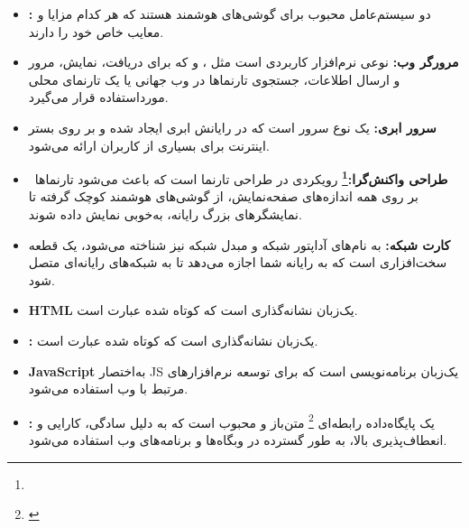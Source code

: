 \documentclass[12pt,a4paper,oneside]{article}
\begin{document}
\begin{itemize}
					    \item 
					  \textbf{: \label{ref:androidios}}
					  دو سیستم‌عامل محبوب برای گوشی‌های هوشمند هستند که هر کدام مزایا و معایب خاص خود را دارند.

					  \item 
					  \textbf{مرورگر وب:\label{ref:browser}}
					   نوعی نرم‌افزار کاربردی است مثل 
					    ، و 
						که برای دریافت، نمایش، مرور و ارسال اطلاعات، جستجوی تارنماها در وب جهانی یا یک تارنمای محلی مورداستفاده قرار می‌گیرد.
						
						\item 
					  \textbf{سرور ابری:\label{ref:cloudserver}}
					   یک نوع سرور است که در رایانش ابری ایجاد شده و بر روی بستر اینترنت برای بسیاری از کاربران ارائه می‌شود. 
					   
					   \item 
					    \textbf{طراحی واکنش‌گرا:\footnote{}\label{ref:responsivedesign}} رویکردی در طراحی تارنما است که باعث می‌شود تارنماها بر روی همه اندازه‌های صفحه‌نمایش، از گوشی‌های هوشمند کوچک گرفته تا نمایشگرهای بزرگ رایانه، به‌خوبی نمایش داده شوند.

						\item
					  \textbf{ کارت شبکه:\label{ref:networkcard}}
						به نام‌های آداپتور شبکه و مبدل شبکه نیز شناخته می‌شود، یک قطعه سخت‌افزاری است که به رایانه شما اجازه می‌دهد تا به شبکه‌های رایانه‌ای متصل شود.

						\item
					   \textbf{HTML\rl{:}\label{ref:html}}
					   یک‌زبان نشانه‌گذاری است که کوتاه شده عبارت
					     است.
					     
					   \item
					   \textbf{:\label{ref:css}}
					    یک‌زبان نشانه‌گذاری است که کوتاه شده عبارت
					      است.
					      
					   \item
					   \textbf{JavaScript\rl{:}\label{ref:js}}
به‌اختصار JS یک‌زبان برنامه‌نویسی است که برای توسعه نرم‌افزارهای مرتبط با وب استفاده می‌شود.
					    
					    \item 
					   \textbf{:\label{ref:mysql}}
					   یک 
					   پایگاه‌داده رابطه‌ای
					   \footnote{\label{ref:rd}}
					    متن‌باز و محبوب است که به دلیل سادگی، کارایی و انعطاف‌پذیری بالا، به طور گسترده در وبگاه‌ها و برنامه‌های وب استفاده می‌شود.
					    

\end{itemize}
\end{document}
